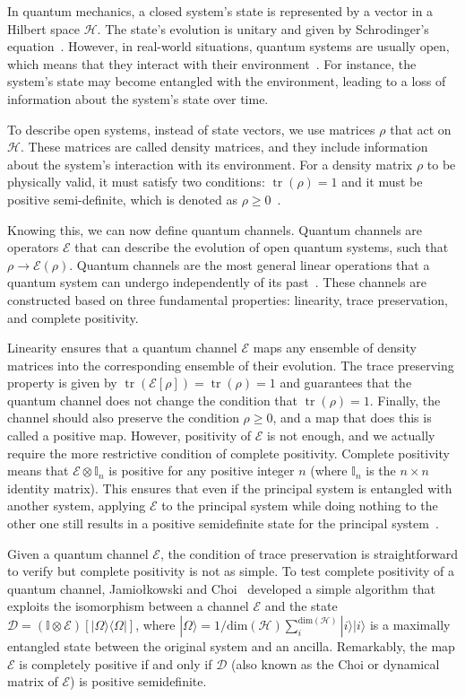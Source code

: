 \documentclass[10pt,letterpaper]{article} %
\DeclareMathOperator{\tr}{tr}
\begin{document}
In quantum mechanics, a closed system's state is represented by a vector in a
Hilbert space $\mathcal{H}$.  The state's evolution is unitary and given by
Schrodinger's equation~\cite{Rieffel}.  However, in real-world situations,
quantum systems are usually open, which means that they interact with their
environment~\cite{Breuer}.  For instance, the system's state may become
entangled with the environment, leading to a loss of information about the
system's state over time.

To describe open systems, instead of state vectors, we use matrices $\rho$ that
act on $\mathcal{H}$.  These matrices are called density matrices, and they
include information about the system's interaction with its environment.  For a
density matrix $\rho$ to be physically valid, it must satisfy two conditions:
$\tr(\rho) = 1$ and it must be positive semi-definite, which is denoted as
$\rho \geq 0$~\cite{chuangbook}.


Knowing this, we can now define quantum channels.  Quantum channels are
operators $\mathcal{E}$ that can describe the evolution of open quantum
systems, such that $\rho \rightarrow \mathcal{E}(\rho)$.  Quantum channels are
the most general linear operations that a quantum system can undergo
independently of its past~\cite{zimansbook,cirac}.  These channels are
constructed based on three fundamental properties: linearity, trace
preservation, and complete positivity.

Linearity ensures that a quantum channel $\mathcal{E}$ maps any ensemble of
density matrices into the corresponding ensemble of their evolution.  The trace
preserving property is given by $\tr (\mathcal{E}[\rho]) = \tr (\rho) = 1$ and
guarantees that the quantum channel does not change the condition that
$\tr(\rho) = 1$.  Finally, the channel should also preserve the condition $\rho
\geq 0$, and a map that does this is called a positive map.  However,
positivity of $\mathcal{E}$ is not enough, and we actually require the more
restrictive condition of complete positivity.  Complete positivity means that
$\mathcal{E} \otimes \mathbb{I}_n$ is positive for any positive integer $n$
(where $\mathbb{I}_n$ is the $n\times n$ identity matrix).  This ensures that
even if the principal system is entangled with another system, applying
$\mathcal{E}$ to the principal system while doing nothing to the other one
still results in  a positive semidefinite state for the principal
system~\cite{chuangbook}. 

Given a quantum channel $\mathcal{E}$, the condition of trace preservation is
straightforward to verify but complete positivity is not as simple.  To test
complete positivity of a quantum channel, Jamiołkowski and
Choi~\cite{choi,jamil} developed a simple algorithm that exploits the
isomorphism between a channel $\mathcal{E}$ and the state $\mathcal{D} =
(\mathbb{I} \otimes \mathcal{E}) [|\Omega \rangle \langle  \Omega|]$, where
$|\Omega\rangle = 1/\text{dim}(\mathcal{H}) \sum_{i}^{\text{dim}(\mathcal{H})}
|i \rangle |i \rangle$ is a maximally entangled state between the original
system and an ancilla.  Remarkably, the map $\mathcal{E}$ is completely
positive if and only if $\mathcal{D}$ (also known as the Choi or dynamical
matrix of $\mathcal{E}$) is positive semidefinite.
\end{document}
